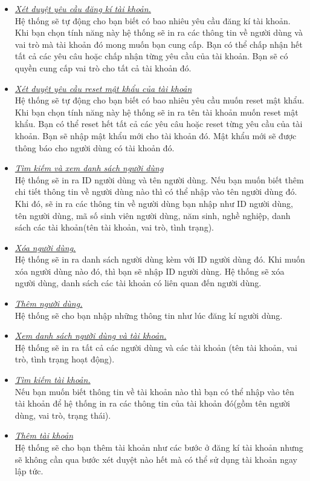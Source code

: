 \documentclass[16pt,a4paper,oneside]{article}
\begin{document}
\begin{itemize}
	\item \underline{\textit{Xét duyệt yêu cầu đăng kí tài khoản.}}\\
		Hệ thống sẽ tự động cho bạn biết có bao nhiêu yêu cầu đăng kí tài khoản. Khi bạn chọn tính năng này hệ thống sẽ in ra các thông tin về người dùng và vai trò mà tài khoản đó mong muốn bạn cung cấp. Bạn có thể chấp nhận hết tất cả các yêu câu hoặc chấp nhận từng yêu cầu của tài khoản. Bạn sẽ có quyền cung cấp vai trò cho tất cả tài khoản đó.
	\item \underline{\textit{Xét duyệt yêu cầu reset mật khẩu của tài khoản}}\\
		Hệ thống sẽ tự động cho bạn biết có bao nhiêu yêu cầu muốn reset mật khẩu. Khi bạn chọn tính năng này hệ thống sẽ in ra tên tài khoản muốn reset mật khẩu. Bạn có thể reset hết tất cả các yêu câu hoặc reset từng yêu cầu của tài khoản. Bạn sẽ nhập mật khẩu mới cho tài khoản đó. Mật khẩu mới sẽ được thông báo cho người dùng có tài khoản đó.
	\item \underline{\textit{Tìm kiếm và xem danh sách người dùng}}\\
		Hệ thống sẽ in ra ID người dùng và tên người dùng. Nếu bạn muốn biết thêm chi tiết thông tin về người dùng nào thì có thể nhập vào tên người dùng đó.
		Khi đó, sẽ in ra các thông tin về người dùng bạn nhập như ID người dùng, tên người dùng, mã số sinh viên người dùng, năm sinh, nghề nghiệp, danh sách các tài khoản(tên tài khoản, vai trò, tình trạng).
	\item \underline{\textit{Xóa người dùng.}}\\
		Hệ thống sẽ in ra danh sách người dùng kèm với ID người dùng đó. Khi muốn xóa người dùng nào đó, thì bạn sẽ nhập ID người dùng. Hệ thống sẽ xóa người dùng, danh sách các tài khoản có liên quan đến người dùng.
	\item \underline{\textit{Thêm người dùng.}}\\
		Hệ thống sẽ cho bạn nhập những thông tin như lúc đăng kí người dùng.
	\item \underline{\textit{Xem danh sách người dùng và tài khoản.}}\\
		Hệ thống sẽ in ra tất cả các người dùng và các tài khoản (tên tài khoản, vai trò, tình trạng hoạt động).
	\item \underline{\textit{Tìm kiếm tài khoản.}}\\
		Nếu bạn muốn biết thông tin về tài khoản nào thì bạn có thể nhập vào tên tài khoản để hệ thống in ra các thông tin của tài khoản đó(gồm tên người dùng, vai trò, trạng thái).
	\item \underline{\textit{Thêm tài khoản}}\\
	Hệ thống sẽ cho bạn thêm tài khoản như các bước ở đăng kí tài khoản nhưng sẽ không cần qua bước xét duyệt nào hết mà có thể sử dụng tài khoản ngay lập tức.
\end{itemize}
\end{document}
